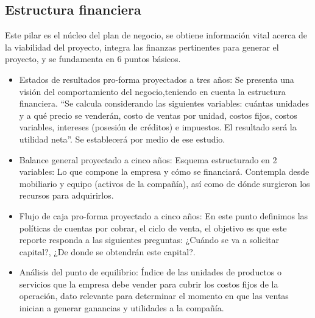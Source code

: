 \subsection{Estructura financiera}

Este pilar es el núcleo del plan de negocio, se obtiene información vital acerca de la
viabilidad del proyecto, integra las finanzas pertinentes para generar el proyecto, y se fundamenta en 6 puntos básicos.

\begin{itemize}
    \item Estados de resultados pro-forma proyectados a tres años: Se presenta una visión del comportamiento del negocio,teniendo en cuenta la estructura financiera. “Se calcula considerando las siguientes variables: cuántas unidades y a qué precio se venderán, costo de ventas por unidad, costos fijos, costos variables, intereses (posesión de créditos) e impuestos. El resultado será la utilidad neta”. Se establecerá por medio de ese estudio.

    \item Balance general proyectado a cinco años: Esquema estructurado en 2 variables: Lo que compone la empresa y cómo se financiará. Contempla desde mobiliario y equipo (activos de la compañía), así como de dónde surgieron los recursos para adquirirlos.

    \item Flujo de caja pro-forma proyectado a cinco años: En este punto definimos las políticas de cuentas por cobrar, el ciclo de venta, el objetivo es que este reporte responda a las siguientes preguntas: ¿Cuándo se va a solicitar capital?, ¿De donde se obtendrán este capital?.

    \item Análisis del punto de equilibrio: Índice de las unidades de productos o servicios que la empresa debe vender para cubrir los costos fijos de la operación, dato relevante para    determinar el momento en que las ventas inician a generar ganancias y utilidades a la   compañía.
\end{itemize}